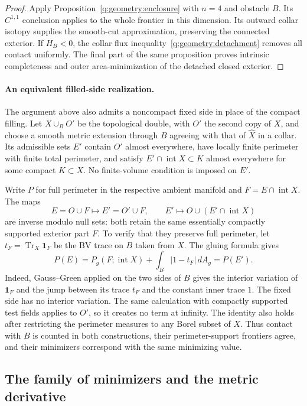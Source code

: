 \begin{proof}
Apply Proposition~\ref{q:geometry:enclosure} with $n=4$ and obstacle
$B$. Its $C^{1,1}$ conclusion applies to the whole frontier in this
dimension. Its outward collar isotopy supplies the smooth-cut
approximation, preserving the connected exterior. If $H_B<0$, the
collar flux inequality~\eqref{q:geometry:detachment} removes all
contact uniformly. The final part of the same proposition proves
intrinsic completeness and outer area-minimization of the detached
closed exterior.
\end{proof}

\paragraph{An equivalent filled-side realization.}
The argument above also admits a noncompact fixed side in place of
the compact filling.
Let $X\cup_B O'$ be the topological double, with $O'$ the second copy
of $X$, and choose a smooth metric extension through $B$ agreeing with
that of $\widehat X$ in a collar. Its admissible sets $E'$ contain
$O'$ almost everywhere, have locally finite perimeter with finite
total perimeter, and satisfy
$E'\cap\operatorname{int}X\subset K$ almost everywhere for some compact
$K\subset X$. No finite-volume condition is imposed on $E'$.

Write $P$ for full perimeter in the respective ambient manifold and
$F=E\cap\operatorname{int}X$. The maps
\[
 E=O\cup F\longmapsto E'=O'\cup F,
 \qquad E'\longmapsto O\cup(E'\cap\operatorname{int}X)
\]
are inverse modulo null sets: both retain the same essentially
compactly supported exterior part $F$. To verify that they preserve
full perimeter, let $t_F=\operatorname{Tr}_X\mathbf1_F$ be the BV
trace on $B$ taken from $X$. The gluing formula gives
\[
 P(E)=P_g(F;\operatorname{int}X)
       +\int_B|1-t_F|\,dA_g=P(E').
\]
Indeed, Gauss--Green applied on the two sides of $B$ gives the
interior variation of $\mathbf1_F$ and the jump between its trace
$t_F$ and the constant inner trace $1$. The fixed side has no
interior variation. The same calculation with compactly supported
test fields applies to $O'$, so it creates no term at infinity.
The identity also holds after restricting the perimeter measures
to any Borel subset of $X$. Thus contact with $B$ is counted in both
constructions, their perimeter-support frontiers agree, and their
minimizers correspond with the same minimizing value.

\subsection{The family of minimizers and the metric derivative}
\label{q4:enc:variation-setup}

